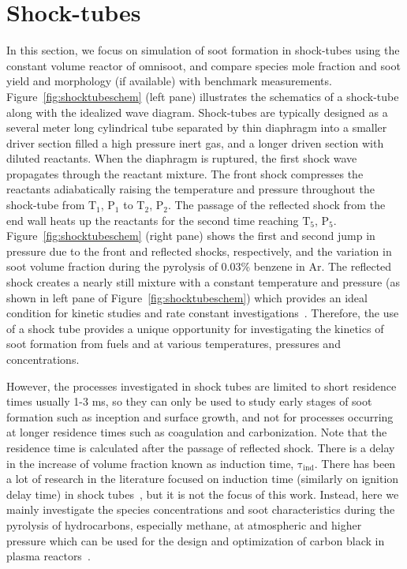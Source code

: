 \section{Shock-tubes}

In this section, we focus on simulation of soot formation in shock-tubes using the constant volume reactor of omnisoot, and compare species mole fraction and soot yield and morphology (if available) with benchmark measurements. Figure~\ref{fig:shocktubeschem} (left pane) illustrates the schematics of a shock-tube along with the idealized wave diagram. Shock-tubes are typically designed as a several meter long cylindrical tube separated by thin diaphragm into a smaller driver section filled a high pressure inert gas, and a longer driven section with diluted reactants. When the diaphragm is ruptured, the first shock wave propagates through the reactant mixture. The front shock compresses the reactants adiabatically raising the temperature and pressure throughout the shock-tube from $\mathrm{T_1}$, $\mathrm{P_1}$ to $\mathrm{T_2}$, $\mathrm{P_2}$. The passage of the reflected shock from the end wall heats up the reactants for the second time reaching $\mathrm{T_5}$, $\mathrm{P_5}$. Figure~\ref{fig:shocktubeschem} (right pane) shows the first and second jump in pressure due to the front and reflected shocks, respectively, and the variation in soot volume fraction during the pyrolysis of 0.03\% benzene in Ar. The reflected shock creates a nearly still mixture with a constant temperature and pressure (as shown in left pane of Figure~\ref{fig:shocktubeschem}) which provides an ideal condition for kinetic studies and rate constant investigations~\citep{kee2017chemically}. Therefore, the use of a shock tube provides a unique opportunity for investigating the kinetics of soot formation from fuels and at various temperatures, pressures and concentrations.

However, the processes investigated in shock tubes are limited to short residence times usually 1-3 ms, so they can only be used to study early stages of soot formation such as inception and surface growth, and not for processes occurring at longer residence times such as coagulation and carbonization. Note that the residence time is calculated after the passage of reflected shock. There is a delay in the increase of volume fraction known as induction time, $\mathrm{\tau_{ind}}$. There has been a lot of research in the literature focused on induction time (similarly on ignition delay time) in shock tubes~\citep{fussey1978shock}, but it is not the focus of this work. Instead, here we mainly investigate the species concentrations and soot characteristics during the pyrolysis of hydrocarbons, especially methane, at atmospheric and higher pressure which can be used for the design and optimization of carbon black in plasma reactors~\citep{fulcheri2023energy}. 

